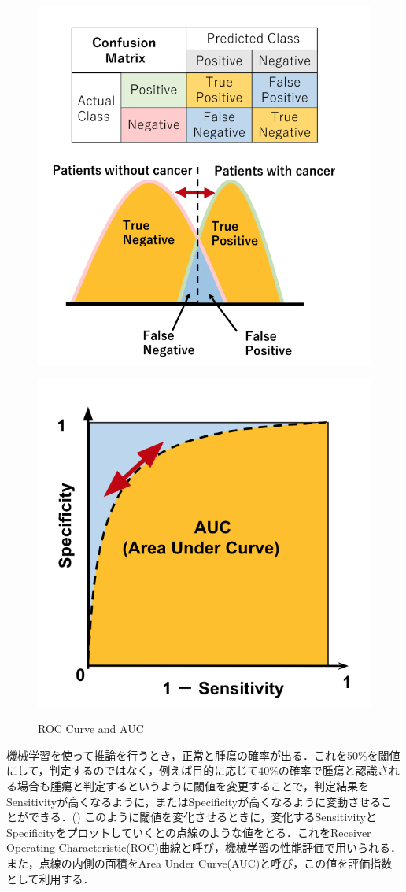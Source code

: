 \begin{figure}[H]
	\centering
	\begin{minipage}{0.8\columnwidth}
		\centering
		\includegraphics[clip, width=0.7\linewidth]{fig/chapter2/why_roc}
		\label{fig:why_roc}
	\end{minipage}
	\begin{minipage}{0.6\columnwidth}
		\centering
		\includegraphics[clip, width=0.7\linewidth]{fig/chapter2/roc_curve}
		\label{fig:roc_curve}
	\end{minipage}
	\caption{ROC Curve and AUC}
	\label{fig:roc}
\end{figure}

機械学習を使って推論を行うとき，正常と腫瘍の確率が出る．これを50\%を閾値にして，判定するのではなく，例えば目的に応じて40\%の確率で腫瘍と認識される場合も腫瘍と判定するというように閾値を変更することで，判定結果をSensitivityが高くなるように，またはSpecificityが高くなるように変動させることができる．()
このように閾値を変化させるときに，変化するSensitivityとSpecificityをプロットしていくとの点線のような値をとる．これをReceiver Operating Characteristic(ROC)曲線と呼び，機械学習の性能評価で用いられる．また，点線の内側の面積をArea Under Curve(AUC)と呼び，この値を評価指数として利用する．

